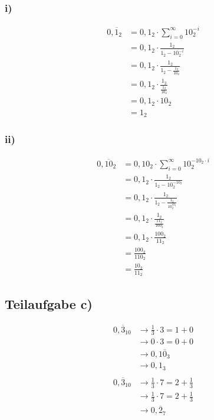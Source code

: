 \documentclass{llncs}
\begin{document}
\subsubsection*{i)}

\begin{align*}
0,\overline{1}_2 &= 0,1_2 \cdot \sum_{i=0}^{\infty} 10^{-i}_2 \\
               &= 0,1_2 \cdot \frac{1_2}{1_2-10^{-i}_2} \\
               &= 0,1_2 \cdot \frac{1_2}{1_2-\frac{1_2}{10_2}} \\
               &= 0,1_2 \cdot \frac{1_2}{\frac{1_2}{10_2}} \\
               &= 0,1_2 \cdot 10_2 \\
               &= 1_2
\end{align*}

\subsubsection*{ii)}

\begin{align*}
0,\overline{10}_2 &= 0,10_2 \cdot \sum_{i=0}^{\infty} 10^{-10_2 \cdot i}_2 \\
                  &= 0,1_2 \cdot \frac{1_2}{1_2-10^{-10_2}_2} \\
                  &= 0,1_2 \cdot \frac{1_2}{1_2-\frac{1_2}{10^{10_2}_2}} \\
                  &= 0,1_2 \cdot \frac{1_2}{\frac{11_2}{100_2}} \\
                  &= 0,1_2 \cdot \frac{100_2}{11_2} \\
                  &= \frac{100_2}{110_2} \\
                  &= \frac{10_2}{11_2}
\end{align*}


\subsection*{Teilaufgabe c)}

\begin{align*}
0,\overline{3}_{10} &\longrightarrow \frac{1}{3} \cdot 3 = 1 + 0 \\
                    &\longrightarrow 0 \cdot 3 = 0 + 0 \\
                    &\longrightarrow 0,1\overline{0}_{3} \\
                    &\longrightarrow 0,1_{3} \\
                  \\
0,\overline{3}_{10} &\longrightarrow \frac{1}{3} \cdot 7 = 2 + \frac{1}{3} \\
                    &\longrightarrow \frac{1}{3} \cdot 7 = 2 + \frac{1}{3} \\
                    &\longrightarrow 0,\overline{2}_{7}
\end{align*}
\end{document}
